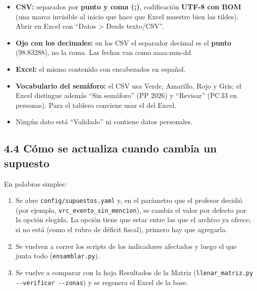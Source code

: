 \documentclass[11pt,letterpaper]{article}
\begin{document}
\begin{itemize}
\item \textbf{CSV:} separados por \textbf{punto y coma (;)}, codificación \textbf{UTF-8 con BOM} (una marca invisible al inicio que hace que Excel muestre bien las tildes). Abrir en Excel con ``Datos \textgreater{} Desde texto/CSV''.
\item \textbf{Ojo con los decimales:} en los CSV el separador decimal es el \textbf{punto} (98.83288), no la coma. Las fechas van como aaaa-mm-dd.
\item \textbf{Excel:} el mismo contenido con encabezados en español.
\item \textbf{Vocabulario del semáforo:} el CSV usa Verde, Amarillo, Rojo y Gris; el Excel distingue además ``Sin semáforo'' (PP 2026) y ``Revisar'' (PC.I3 en personas). Para el tablero conviene usar el del Excel.
\item Ningún dato está ``Validado'' ni contiene datos personales.
\end{itemize}

\subsection*{4.4 Cómo se actualiza cuando cambia un supuesto}


En palabras simples:

\begin{enumerate}
\item Se abre \texttt{\footnotesize config/\allowbreak{}supuestos.\allowbreak{}yaml} y, en el parámetro que el profesor decidió (por ejemplo, \texttt{\footnotesize vrc\_\allowbreak{}evento\_\allowbreak{}sin\_\allowbreak{}mencion}), se cambia el valor por defecto por la opción elegida. La opción tiene que estar entre las que el archivo ya ofrece; si no está (como el rubro de déficit fiscal), primero hay que agregarla.
\item Se vuelven a correr los scripts de los indicadores afectados y luego el que junta todo (\texttt{\footnotesize ensamblar.\allowbreak{}py}).
\item Se vuelve a comparar con la hoja Resultados de la Matriz (\texttt{\footnotesize llenar\_\allowbreak{}matriz.\allowbreak{}py -\allowbreak{}-\allowbreak{}verificar -\allowbreak{}-\allowbreak{}zonas}) y se regenera el Excel de la base.
\end{enumerate}
\end{document}
